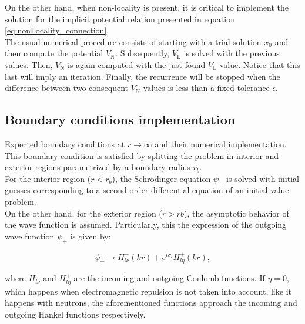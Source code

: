 \documentclass[openany]{book}
\begin{document}
On the other hand, when non-locality is present, it is critical to implement the solution for the implicit potential relation presented in equation \ref{eq:nonLocality_connection}. \\

The usual numerical procedure consists of starting with a trial solution $x_0$ and then compute the potential $V_\mathrm{N}$. Subsequently, $V_\mathrm{L}$ is solved with the previous values. Then, $V_\mathrm{N}$ is again computed with the just found $V_\mathrm{L}$ value. Notice that this last will imply an iteration. Finally, the recurrence will be stopped when the difference between two consequent $V_\mathrm{N}$ values is less than a fixed tolerance $\epsilon$.

\subsection{Boundary conditions implementation} \label{sub:diffSolvingBoundaries}

Expected boundary conditions at $r \rightarrow \infty$ and their numerical implementation. \\

This boundary condition is satisfied by splitting the problem in interior and exterior regions parametrized by a boundary radius $r_b$. \\

For the interior region ($r < r_b$), the Schrödinger equation $\psi_{-}$ is solved with initial guesses corresponding to a second order differential equation of an initial value problem.  \\

On the other hand, for the exterior region ($r > rb$), the asymptotic behavior of the wave function is assumed. Particularly, this the expression of the outgoing wave function $\psi_{+}$ is given by: 

\begin{equation}\label{eq:numericalIntegration_outgoingFunction}
	\psi_{+} \rightarrow H^{-}_{l\nu}(kr) + e^{i\sigma_l} H^{+}_{l\eta}(kr),
\end{equation}
	
where $H^{-}_{l\nu}$ and $H^{+}_{l\eta}$ are the incoming and outgoing Coulomb functions. If $\eta = 0$, which happens when electromagnetic repulsion is not taken into account, like it happens with neutrons, the aforementioned functions approach the incoming and outgoing Hankel functions respectively. \\
	
\end{document}

